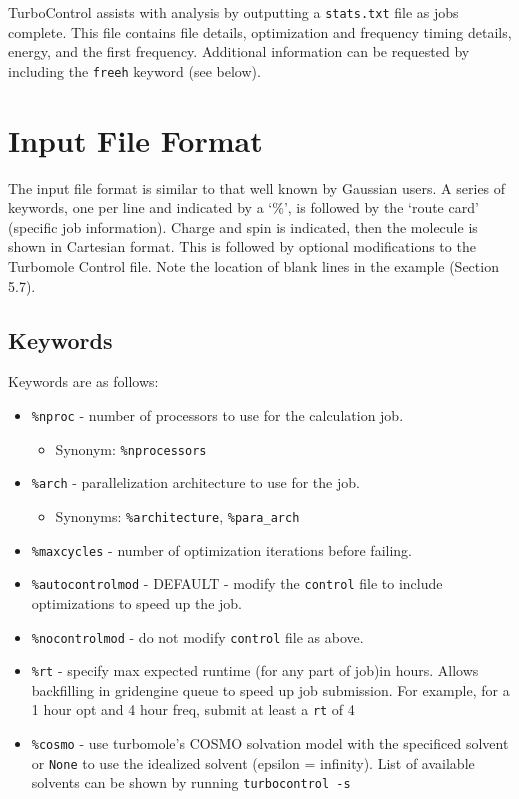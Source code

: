 TurboControl assists with analysis by outputting a \texttt{stats.txt} file as jobs
complete. This file contains file details, optimization and frequency
timing details, energy, and the first frequency. Additional information
can be requested by including the \texttt{freeh} keyword (see below).

\section{Input File Format}

The input file format is similar to that well known by Gaussian users. A
series of keywords, one per line and indicated by a `\%', is followed by
the `route card' (specific job information). Charge and spin is
indicated, then the molecule is shown in Cartesian format. This is
followed by optional modifications to the Turbomole Control file. Note
the location of blank lines in the example (Section 5.7).

\subsection{Keywords}

Keywords are as follows:

\begin{itemize}
\item \texttt{\%nproc} - number of processors to use for the calculation job.
  \begin{itemize}
    \item Synonym: \texttt{\%nprocessors}
  \end{itemize}
\item \texttt{\%arch} - parallelization architecture to use for the job.
  \begin{itemize}
    \item Synonyms: \texttt{\%architecture}, \texttt{\%para\_arch}
   \end {itemize}
\item \texttt{\%maxcycles} - number of optimization iterations before failing.
\item \texttt{\%autocontrolmod} - DEFAULT - modify the \texttt{control} file to include optimizations to speed up the job.
\item \texttt{\%nocontrolmod} - do not modify \texttt{control} file as above.
\item \texttt{\%rt} - specify max expected runtime (for any part of job)in hours. Allows backfilling in gridengine queue to speed up job submission. For example, for a 1 hour opt and 4 hour freq, submit at least a \texttt{rt} of 4
\item \texttt{\%cosmo} - use turbomole's COSMO solvation model with the specificed solvent or \texttt{None} to use the idealized solvent (epsilon = infinity). List of available solvents can be shown by running \texttt{turbocontrol -s}
\end{itemize}

